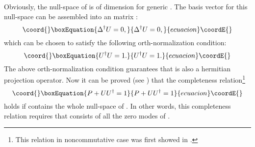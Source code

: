 \documentclass[a4paper,a4paper]{article}
\begin{document}
Obviously, the null-space of \coordHE{} is of \coordHE{} dimension for
generic \coordHE{}. The basis vector for this null-space can be assembled into an \coordHE{} matrix \coordHE{}:
\begin{equation}\coord{}\boxEquation{
\Delta^\dag U=0,
}{
\Delta^\dag U=0,
}{ecuacion}\coordE{}\end{equation}
which can be chosen to satisfy the following orth-normalization condition:
\begin{equation}\coord{}\boxEquation{  \label{normal}
U^\dag U=1.
}{  U^\dag U=1.
}{ecuacion}\coordE{}\end{equation}
The above orth-normalization condition guarantees that \coordHE{}
is also a hermitian projection operator. Now it can be proved (see
\cite{TianZhu2}) that the completeness relation\footnote{This
relation in noncommutative case was first showed in
\cite{Paperb}.}
\begin{equation}\coord{}\boxEquation{  \label{complete}
P+UU^\dag=1
}{  P+UU^\dag=1
}{ecuacion}\coordE{}\end{equation}
holds if \coordHE{} contains the whole null-space of \myHighlight{$\Delta^\dagger$}\coordHE{}. In
other words, this completeness relation requires that \coordHE{} consists
of all the zero modes of \myHighlight{$\Delta^\dagger$}\coordHE{}.
\end{document}
